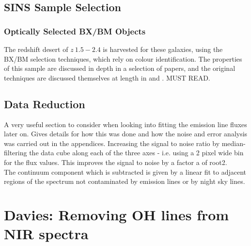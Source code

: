\documentclass{literature}
\begin{document}
\subsection{SINS Sample Selection}
\subsubsection{Optically Selected BX/BM Objects}
The redshift desert of $z~1.5-2.4$ is harvested for these galaxies, using the BX/BM selection techniques, which rely on colour identification. 
The properties of this sample are discussed in depth in a selection of papers, and the original techniques are discussed themselves at length in \citep{Adelberger2004} and \citep{Steidel2004}. MUST READ.

\subsection{Data Reduction}
A very useful section to consider when looking into fitting the emission line fluxes later on. Gives details for how this was done and how the noise and error analysis was carried out in the appendices. Increasing the signal to noise ratio by median-filtering the data cube along each of the three axes - i.e. using a 2 pixel wide bin for the flux values. This improves the signal to noise by a factor a of root2. \\ 
The continuum component which is subtracted is given by a linear fit to adjacent regions of the spectrum not contaminated by emission lines or by night sky lines. 


\section{Davies: Removing OH lines from NIR spectra}
\end{document}
